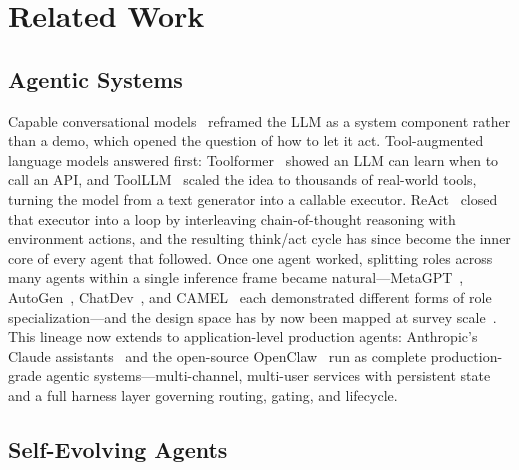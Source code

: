 \section{Related Work}
\label{sec:related}

\subsection{Agentic Systems}
\label{subsec:related-agentic}

Capable conversational models~\citep{achiam2023gpt} reframed the LLM as a system component rather than a demo, which opened the question of how to let it act. Tool-augmented language models answered first: Toolformer~\citep{schick2023toolformer} showed an LLM can learn when to call an API, and ToolLLM~\citep{qin2024toolllm} scaled the idea to thousands of real-world tools, turning the model from a text generator into a callable executor. ReAct~\citep{yao2022react} closed that executor into a loop by interleaving chain-of-thought reasoning with environment actions, and the resulting think/act cycle has since become the inner core of every agent that followed. Once one agent worked, splitting roles across many agents within a single inference frame became natural---MetaGPT~\citep{hong2024metagpt}, AutoGen~\citep{wu2024autogen}, ChatDev~\citep{qian2024chatdev}, and CAMEL~\citep{li2023camel} each demonstrated different forms of role specialization---and the design space has by now been mapped at survey scale~\citep{wang2024survey,guo2024large}. This lineage now extends to application-level production agents: Anthropic's Claude assistants~\citep{claude3-anthropic2024} and the open-source OpenClaw~\citep{openclaw-github} run as complete production-grade agentic systems---multi-channel, multi-user services with persistent state and a full harness layer governing routing, gating, and lifecycle. 
\subsection{Self-Evolving Agents}
\label{subsec:related-evolving}

